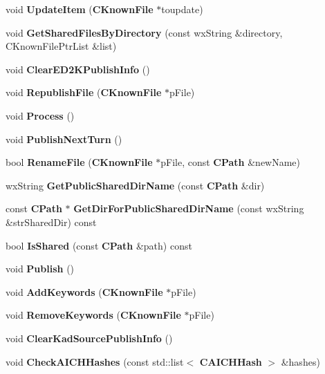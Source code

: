 \begin{DoxyCompactItemize}
\item 
void {\bfseries UpdateItem} ({\bf CKnownFile} $\ast$toupdate)\label{classCSharedFileList_aa057a959c0743df6ca93d2dc258f11b2}

\item 
void {\bfseries GetSharedFilesByDirectory} (const wxString \&directory, CKnownFilePtrList \&list)\label{classCSharedFileList_a716279e47aa152889d36f3f19d68f190}

\item 
void {\bfseries ClearED2KPublishInfo} ()\label{classCSharedFileList_a993b3a443cbf8ef4d881c0bc9250c7f1}

\item 
void {\bfseries RepublishFile} ({\bf CKnownFile} $\ast$pFile)\label{classCSharedFileList_afcb2e1299429285db8c21c9c95b3e366}

\item 
void {\bfseries Process} ()\label{classCSharedFileList_af4066ca68c9a495d5ff83f6729f003d5}

\item 
void {\bfseries PublishNextTurn} ()\label{classCSharedFileList_af170c158d64d27e8c90f8757b9e16b67}

\item 
bool {\bfseries RenameFile} ({\bf CKnownFile} $\ast$pFile, const {\bf CPath} \&newName)\label{classCSharedFileList_a856e375fa0479d9ad029d07124cd7adc}

\item 
wxString {\bf GetPublicSharedDirName} (const {\bf CPath} \&dir)
\item 
const {\bf CPath} $\ast$ {\bfseries GetDirForPublicSharedDirName} (const wxString \&strSharedDir) const \label{classCSharedFileList_a00ed317937b60893935e00fe8a3194eb}

\item 
bool {\bf IsShared} (const {\bf CPath} \&path) const \label{classCSharedFileList_ace0e9ad560260cb15278d991a64c86f7}

\item 
void {\bfseries Publish} ()\label{classCSharedFileList_a5adc9cf22436621677bfd2451b5722ad}

\item 
void {\bfseries AddKeywords} ({\bf CKnownFile} $\ast$pFile)\label{classCSharedFileList_adb598d0e117deccf3f7ef0975fb5d830}

\item 
void {\bfseries RemoveKeywords} ({\bf CKnownFile} $\ast$pFile)\label{classCSharedFileList_a31f8a4f0539f4ea34a6df89b43e7a0fb}

\item 
void {\bfseries ClearKadSourcePublishInfo} ()\label{classCSharedFileList_a9a526fdea0b9050089b38b89b134d225}

\item 
void {\bf CheckAICHHashes} (const std::list$<$ {\bf CAICHHash} $>$ \&hashes)
\end{DoxyCompactItemize}
